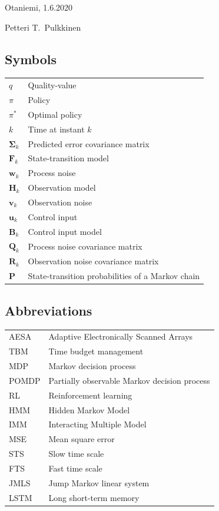 \documentclass[english, 12pt, a4paper, elec, utf8, a-1b, online]{aaltothesis}
\newcommand{\ecov}{\boldsymbol{\Sigma}_k}
\renewcommand{\vec}[1]{\mathbf{#1}}
\newcommand{\stmodel}{\vec{F}_k}
\newcommand{\cimodel}{\vec{B}_k}
\newcommand{\cinput}{\vec{u}_k}
\newcommand{\pnoise}{\vec{w}_k}
\newcommand{\omodel}{\vec{H}_k}
\newcommand{\onoise}{\vec{v}_k}
\newcommand{\ocov}{\vec{R}_k}
\newcommand{\pcov}{\vec{Q}_k}
\newcommand{\stprobs}{\vec{P}}
\begin{document}

\vspace{5cm}
Otaniemi, 1.6.2020

\vspace{5mm}
{\hfill Petteri T.\ Pulkkinen \hspace{1cm}}

\newpage

\thesistableofcontents



\subsection*{Symbols}

\begin{tabular}{ll}
$q$ & Quality-value \\
$\pi$ & Policy \\
$\pi^*$ & Optimal policy \\
$k$ & Time at instant $k$\\
$\ecov$ & Predicted error covariance matrix \\
$\stmodel$ & State-transition model \\
$\pnoise$ & Process noise \\
$\omodel$ & Observation model \\
$\onoise$ & Observation noise \\
$\cinput$ & Control input \\
$\cimodel$ & Control input model \\
$\pcov$ & Process noise covariance matrix \\
$\ocov$ & Observation noise covariance matrix \\
$\stprobs$ & State-transition probabilities of a Markov chain
\end{tabular}

\subsection*{Abbreviations}

\begin{tabular}{ll}
AESA & Adaptive Electronically Scanned Arrays \\
TBM & Time budget management \\
MDP         & Markov decision process \\
POMDP      & Partially observable Markov decision process \\
RL & Reinforcement learning \\
HMM & Hidden Markov Model \\
IMM & Interacting Multiple Model \\
MSE & Mean square error \\
STS & Slow time scale \\
FTS & Fast time scale \\
JMLS & Jump Markov linear system \\
LSTM & Long short-term memory
\end{tabular}
\end{document}
